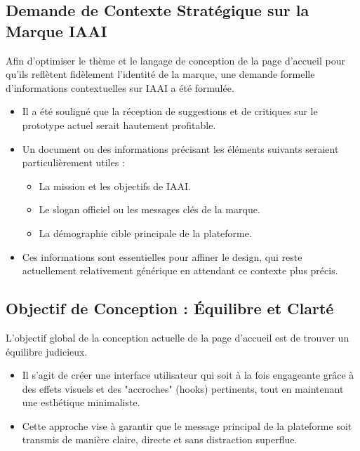\documentclass[12pt, a4paper]{article}
\begin{document}
\subsection{Demande de Contexte Stratégique sur la Marque IAAI}
Afin d'optimiser le thème et le langage de conception de la page d'accueil pour qu'ils reflètent fidèlement l'identité de la marque, une demande formelle d'informations contextuelles sur IAAI a été formulée.
\begin{itemize}
    \item Il a été souligné que la réception de suggestions et de critiques sur le prototype actuel serait hautement profitable.
    \item Un document ou des informations précisant les éléments suivants seraient particulièrement utiles :
    \begin{itemize}
        \item La mission et les objectifs de IAAI.
        \item Le slogan officiel ou les messages clés de la marque.
        \item La démographie cible principale de la plateforme.
    \end{itemize}
    \item Ces informations sont essentielles pour affiner le design, qui reste actuellement relativement générique en attendant ce contexte plus précis.
\end{itemize}

\subsection{Objectif de Conception : Équilibre et Clarté}
L'objectif global de la conception actuelle de la page d'accueil est de trouver un équilibre judicieux.
\begin{itemize}
    \item Il s'agit de créer une interface utilisateur qui soit à la fois engageante grâce à des effets visuels et des "accroches" (hooks) pertinents, tout en maintenant une esthétique minimaliste.
    \item Cette approche vise à garantir que le message principal de la plateforme soit transmis de manière claire, directe et sans distraction superflue.
\end{itemize}
\end{document}
